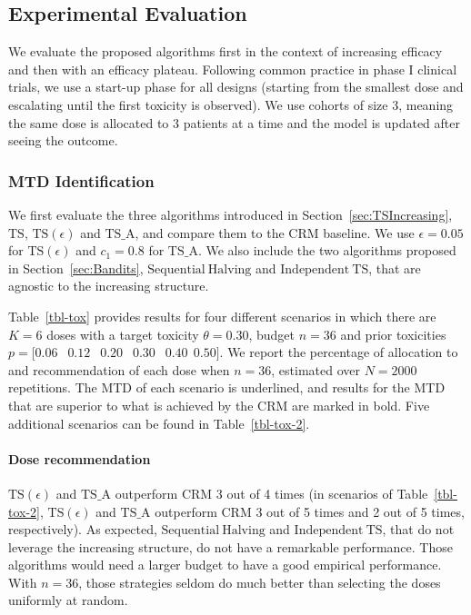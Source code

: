 \subsection{Experimental Evaluation}\label{sec:Experiments}

We evaluate the proposed algorithms first in the context of increasing efficacy and then with an efficacy plateau.
Following common practice in phase I clinical trials, we use a start-up phase for all designs (starting from the smallest dose and escalating until the first toxicity is observed).
We use cohorts of size 3, meaning the same dose is allocated to 3 patients at a time and the model is updated after seeing the outcome. 



\subsubsection{MTD Identification}
We first evaluate the three algorithms introduced in Section~\ref{sec:TSIncreasing}, $\mathrm{TS}$, $\mathrm{TS}(\epsilon)$ and $\mathrm{TS}\_\mathrm{A}$, and compare them to the $\mathrm{CRM}$ baseline. We use $\epsilon = 0.05$ for $\mathrm{TS}(\epsilon)$ and $c_1 = 0.8$ for $\mathrm{TS}\_\mathrm{A}$. We also include the two algorithms proposed in Section~\ref{sec:Bandits}, $\mathrm{Sequential \ Halving}$ and
 $\mathrm{Independent \ TS}$, that are agnostic to the increasing structure. 
 
Table~\ref{tbl-tox} provides results for four different scenarios in which there are $K=6$ doses with a target toxicity $\theta = 0.30$, budget $n=36$ and prior toxicities $p = [0.06$ $\ \ 0.12$ $\ \ 0.20$ $\ \ 0.30$ $\ \ 0.40 \ \ 0.50]$.
We report the percentage of allocation to and recommendation of each dose when $n=36$, estimated over $N=2000$ repetitions.
The MTD of each scenario is underlined, and results for the MTD that are superior to what is achieved by the CRM are marked in bold. Five additional scenarios can be found in Table~\ref{tbl-tox-2}.

\paragraph{Dose recommendation}  $\mathrm{TS}(\epsilon)$ and $\mathrm{TS}\_\mathrm{A}$ outperform CRM 3 out of 4 times (in scenarios of Table~\ref{tbl-tox-2}, $\mathrm{TS}(\epsilon)$ and $\mathrm{TS}\_\mathrm{A}$ outperform CRM 3 out of 5 times and 2 out of 5 times, respectively). As expected, $\mathrm{Sequential \ Halving}$ and
 $\mathrm{Independent \ TS}$, that do not leverage the increasing structure, do not have a remarkable performance. Those algorithms would need a larger budget to have a good empirical performance. With $n=36$, those strategies seldom do much better than selecting the doses uniformly at random.  

